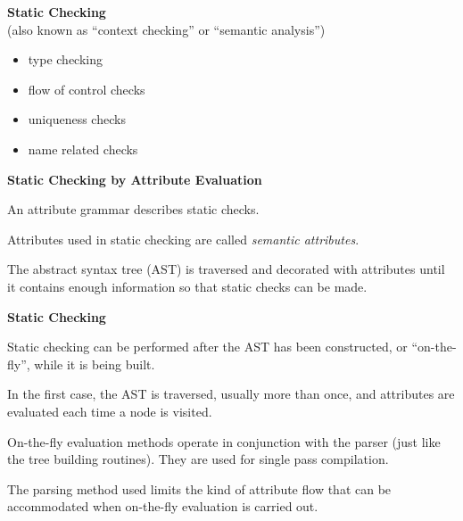 \setcounter{slide}{86}

%
%
\begin{slide}{}
{\bf Static Checking}\\
(also known as ``context checking'' or ``semantic analysis'')

\begin{itemize}
\item type checking
\item flow of control checks
\item uniqueness checks
\item name related checks
\end{itemize}

\end{slide}
%
%
\begin{slide}{}
{\bf Static Checking by Attribute Evaluation}

An attribute grammar describes static checks.

Attributes used in static checking are called
{\em semantic attributes}.  

The abstract syntax tree (AST) is traversed
and decorated with attributes until it
contains enough information so that static
checks can be made.

\end{slide}
%
%
\begin{slide}{}
{\bf Static Checking}

Static checking can be performed after the AST
has been constructed, or ``on-the-fly'', while
it is being built.

In the first case, the AST is traversed, usually
more than once, and attributes are evaluated each
time a node is visited.

On-the-fly evaluation methods operate in conjunction
with the parser (just like the tree building routines).
They are used for single pass compilation.

The parsing method used limits the kind of attribute
flow that can be accommodated when on-the-fly
evaluation is carried out.
\end{slide}


